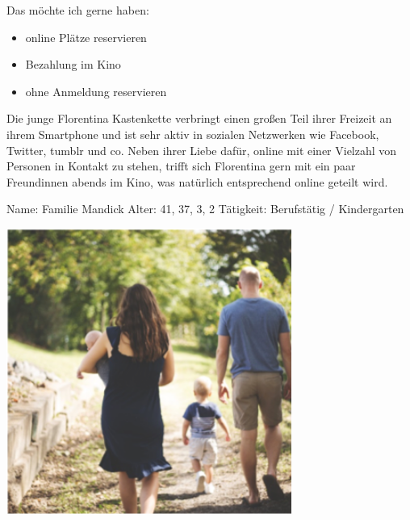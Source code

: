 Das möchte ich gerne haben:
\begin{itemize}
	\item online Plätze reservieren
	\item Bezahlung im Kino
	\item ohne Anmeldung reservieren
\end{itemize}

Die junge Florentina Kastenkette verbringt einen großen Teil ihrer Freizeit an ihrem Smartphone und ist sehr aktiv in sozialen Netzwerken wie Facebook, Twitter, tumblr und co.
Neben ihrer Liebe dafür, online mit einer Vielzahl von Personen in Kontakt zu stehen, trifft sich Florentina gern mit ein paar Freundinnen abends im Kino, was natürlich entsprechend online geteilt wird.

\newpage
{}
\begin{minipage}[t]{0.5\textwidth} 	\vspace{0.0\baselineskip} %
	\begin{entrylist}
		\entry
		{Name:}
		{Familie Mandick}
		\entry
		{Alter:}
		{41, 37, 3, 2}
		\entry
		{Tätigkeit:}
		{Berufstätig / Kindergarten}
	\end{entrylist}
	\begin{barchart}{5.0}\hspace{-1.5mm}
	\end{barchart}
\end{minipage}
\hfil
\begin{minipage}[t]{0.4\textwidth} 	\vspace{0.0\baselineskip} %
	\flushright
	\includegraphics[width=0.70\textwidth]{img/personas/mandick}
\end{minipage}

